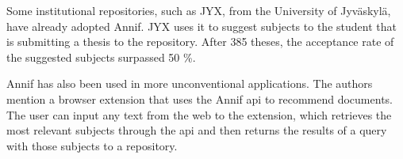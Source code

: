 Some institutional repositories, such as JYX, from the University of Jyväskylä, have already adopted Annif. JYX uses it to suggest subjects to the student that is submitting a thesis to the repository. After 385 theses, the acceptance rate of the suggested subjects surpassed 50 \%.

Annif has also been used in more unconventional applications. The authors mention a browser extension that uses the Annif \acrshort{api} to recommend documents. The user can input any text from the web to the extension, which retrieves the most relevant subjects through the \acrshort{api} and then returns the results of a query with those subjects to a repository.